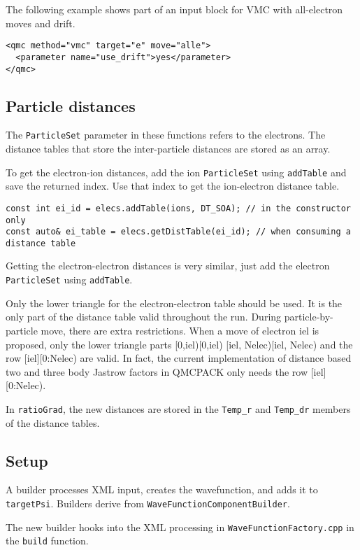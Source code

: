 The following example shows part of an input block for VMC with all-electron moves and drift.

\begin{verbatim}
<qmc method="vmc" target="e" move="alle">
  <parameter name="use_drift">yes</parameter>
</qmc>
\end{verbatim}



\subsection{Particle distances}

The \texttt{ParticleSet} parameter in these functions refers to the electrons.
The distance tables that store the inter-particle distances are stored as an array.

To get the electron-ion distances, add the ion \texttt{ParticleSet} using \texttt{addTable}
and save the returned index. Use that index to get the ion-electron distance table.
\begin{verbatim}
const int ei_id = elecs.addTable(ions, DT_SOA); // in the constructor only
const auto& ei_table = elecs.getDistTable(ei_id); // when consuming a distance table
\end{verbatim}
Getting the electron-electron distances is very similar, just add the electron \texttt{ParticleSet} using \texttt{addTable}.

Only the lower triangle for the electron-electron table should be used.
It is the only part of the distance table valid throughout the run.
During particle-by-particle move, there are extra restrictions.
When a move of electron iel is proposed, only the lower triangle parts [0,iel)[0,iel) [iel, Nelec)[iel, Nelec) and the row [iel][0:Nelec) are valid.
In fact, the current implementation of distance based two and three body Jastrow factors in QMCPACK only needs the row [iel][0:Nelec).

In \texttt{ratioGrad}, the new distances are stored in the \texttt{Temp\_r} and \texttt{Temp\_dr}
members of the distance tables.

\subsection{Setup}

A builder processes XML input, creates the wavefunction, and adds it to \texttt{targetPsi}.
Builders derive from \texttt{WaveFunctionComponentBuilder}.

The new builder hooks into the XML processing in \texttt{WaveFunctionFactory.cpp} in the \texttt{build} function.


